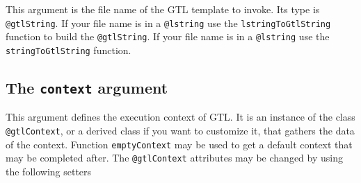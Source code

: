 \documentclass[10pt,openright,twosides,final]{memoir}
\newcommand{\gginline}[1]{\colorbox{light-pink}{\lstinline[language=galgas]{#1}}}
\begin{document}
This argument is the file name of the GTL template to invoke. Its type is \gginline{@gtlString}. If your file name is in a \gginline{@lstring} use the \gginline{lstringToGtlString} function to build the \gginline{@gtlString}. If your file name is in a \gginline{@lstring} use the \gginline{stringToGtlString} function.

\subsection{The \texttt{context} argument}

This argument defines the execution context of GTL. It is an instance of the class \gginline{@gtlContext}, or a derived class if you want to customize it, that gathers the data of the context. Function \gginline{emptyContext} may be used to get a default context that may be completed after. The \gginline{@gtlContext} attributes may be changed by using the following setters


\end{document}

